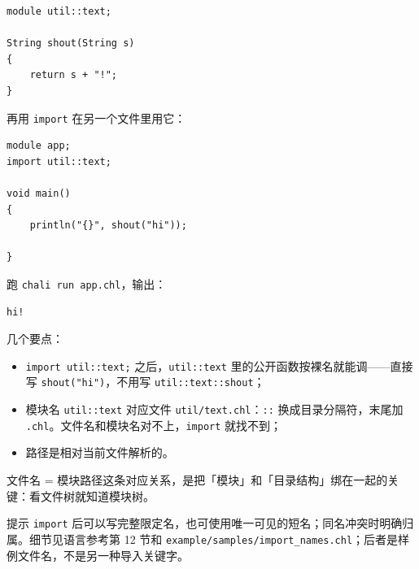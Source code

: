 \par
\medskip
\begin{lstlisting}[style=chali]
module util::text;

String shout(String s)
{
    return s + "!";
}
\end{lstlisting}
\par
\medskip

再用 \texttt{import} 在另一个文件里用它：

\par
\medskip
\begin{lstlisting}[style=chali]
module app;
import util::text;

void main()
{
    println("{}", shout("hi"));

}
\end{lstlisting}
\par
\medskip

跑 \texttt{chali run app.\allowbreak{}chl}，输出：

\par
\medskip
\begin{lstlisting}[style=out]
hi!
\end{lstlisting}
\par
\medskip

几个要点：

\begin{itemize}

\item \texttt{import util:\allowbreak{}:\allowbreak{}text;} 之后，\texttt{util:\allowbreak{}:\allowbreak{}text} 里的公开函数按裸名就能调——直接写 \texttt{shout(\allowbreak{}"hi")\allowbreak{}}，不用写 \texttt{util:\allowbreak{}:\allowbreak{}text:\allowbreak{}:\allowbreak{}shout}；

\item 模块名 \texttt{util:\allowbreak{}:\allowbreak{}text} 对应文件 \texttt{util/\allowbreak{}text.\allowbreak{}chl}：\texttt{:\allowbreak{}:\allowbreak{}} 换成目录分隔符，末尾加 \texttt{.\allowbreak{}chl}。文件名和模块名对不上，\texttt{import} 就找不到；

\item 路径是相对当前文件解析的。

\end{itemize}

文件名 = 模块路径这条对应关系，是把「模块」和「目录结构」绑在一起的关键：看文件树就知道模块树。

\begin{tip}{提示}
\texttt{import} 后可以写完整限定名，也可使用唯一可见的短名；同名冲突时明确归属。细节见语言参考第 12 节和 \texttt{example/\allowbreak{}samples/\allowbreak{}import\_names.\allowbreak{}chl}；后者是样例文件名，不是另一种导入关键字。
\end{tip}

